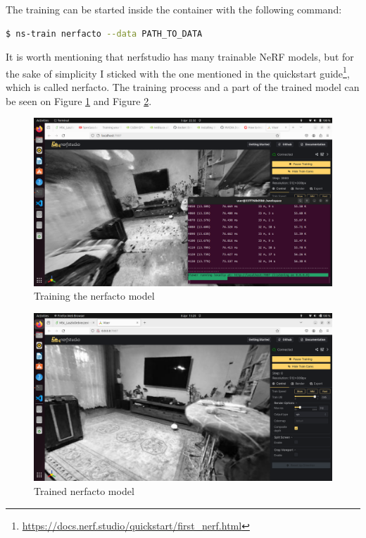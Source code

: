 The training can be started inside the container with the following command:
\FloatBarrier
\begin{lstlisting}[language=bash,frame=single,float=!ht]
$ ns-train nerfacto --data PATH_TO_DATA
\end{lstlisting}
It is worth mentioning that nerfstudio has many trainable NeRF models, but for the sake of simplicity I sticked with the one mentioned in the quickstart guide\footnote{\url{https://docs.nerf.studio/quickstart/first_nerf.html}}, which is called nerfacto. The training process and a part of the trained model can be seen on Figure \ref{fig:training_nerf_karcag} and Figure \ref{fig:trained_nerf_karcag}.

\begin{figure}[htbp]
	\centering
	\includegraphics[width=150mm, keepaspectratio]{figures/nerfstudio.png}
	\caption{Training the nerfacto model}
	\label{fig:training_nerf_karcag}
\end{figure}

\begin{figure}[htbp]
	\centering
	\includegraphics[width=150mm, keepaspectratio]{figures/trained_nerf_karcag1.png}
	\caption{Trained nerfacto model}
	\label{fig:trained_nerf_karcag}
\end{figure}

